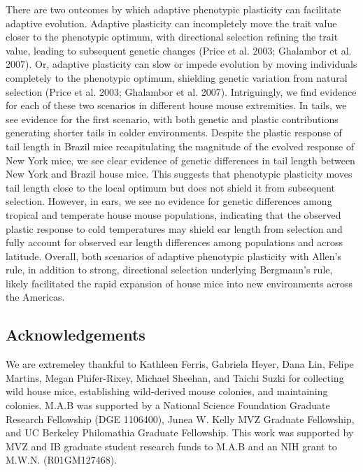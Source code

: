 \documentclass[]{article}
\begin{document}
There are two outcomes by which adaptive phenotypic plasticity can
facilitate adaptive evolution. Adaptive plasticity can incompletely move
the trait value closer to the phenotypic optimum, with directional
selection refining the trait value, leading to subsequent genetic
changes (Price et al. 2003; Ghalambor et al. 2007). Or, adaptive
plasticity can slow or impede evolution by moving individuals completely
to the phenotypic optimum, shielding genetic variation from natural
selection (Price et al. 2003; Ghalambor et al. 2007). Intriguingly, we
find evidence for each of these two scenarios in different house mouse
extremities. In tails, we see evidence for the first scenario, with both
genetic and plastic contributions generating shorter tails in colder
environments. Despite the plastic response of tail length in Brazil mice
recapitulating the magnitude of the evolved response of New York mice,
we see clear evidence of genetic differences in tail length between New
York and Brazil house mice. This suggests that phenotypic plasticity
moves tail length close to the local optimum but does not shield it from
subsequent selection. However, in ears, we see no evidence for genetic
differences among tropical and temperate house mouse populations,
indicating that the observed plastic response to cold temperatures may
shield ear length from selection and fully account for observed ear
length differences among populations and across latitude. Overall, both
scenarios of adaptive phenotypic plasticity with Allen's rule, in
addition to strong, directional selection underlying Bergmann's rule,
likely facilitated the rapid expansion of house mice into new
environments across the Americas.

\vspace{5mm}

\hypertarget{acknowledgements}{%
\subsection{Acknowledgements}\label{acknowledgements}}

We are extremeley thankful to Kathleen Ferris, Gabriela Heyer, Dana Lin,
Felipe Martins, Megan Phifer-Rixey, Michael Sheehan, and Taichi Suzki
for collecting wild house mice, establishing wild-derived mouse
colonies, and maintaining colonies. M.A.B was supported by a National
Science Foundation Graduate Research Fellowship (DGE 1106400), Junea W.
Kelly MVZ Graduate Fellowship, and UC Berkeley Philomathia Graduate
Fellowship. This work was supported by MVZ and IB graduate student
research funds to M.A.B and an NIH grant to M.W.N. (R01GM127468).
\end{document}
